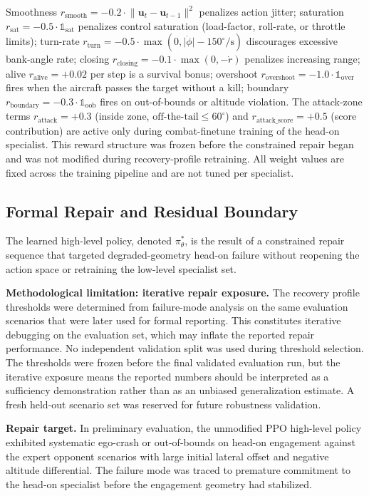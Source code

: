 \documentclass[5p,times]{elsarticle} %
\begin{document}
Smoothness $r_{\text{smooth}} = -0.2 \cdot \lVert \mathbf{u}_t - \mathbf{u}_{t-1} \rVert^2$ penalizes action jitter; saturation $r_{\text{sat}} = -0.5 \cdot \mathbb{1}_{\text{sat}}$ penalizes control saturation (load-factor, roll-rate, or throttle limits); turn-rate $r_{\text{turn}} = -0.5 \cdot \max(0, \lvert \dot{\phi} \rvert - 150^{\circ}/\text{s})$ discourages excessive bank-angle rate; closing $r_{\text{closing}} = -0.1 \cdot \max(0, -\dot{r})$ penalizes increasing range; alive $r_{\text{alive}} = +0.02$ per step is a survival bonus; overshoot $r_{\text{overshoot}} = -1.0 \cdot \mathbb{1}_{\text{over}}$ fires when the aircraft passes the target without a kill; boundary $r_{\text{boundary}} = -0.3 \cdot \mathbb{1}_{\text{oob}}$ fires on out-of-bounds or altitude violation. The attack-zone terms $r_{\text{attack}} = +0.3$ (inside zone, $\text{off-the-tail} \le 60^{\circ}$) and $r_{\text{attack\_score}} = +0.5$ (score contribution) are active only during combat-finetune training of the head-on specialist. This reward structure was frozen before the constrained repair began and was not modified during recovery-profile retraining. All weight values are fixed across the training pipeline and are not tuned per specialist.

\subsection{Formal Repair and Residual Boundary}

The learned high-level policy, denoted $\pi_{\theta}^{*}$, is the result of a constrained repair sequence that targeted degraded-geometry head-on failure without reopening the action space or retraining the low-level specialist set.

\textbf{Methodological limitation: iterative repair exposure.} The recovery profile thresholds were determined from failure-mode analysis on the same evaluation scenarios that were later used for formal reporting. This constitutes iterative debugging on the evaluation set, which may inflate the reported repair performance. No independent validation split was used during threshold selection. The thresholds were frozen before the final validated evaluation run, but the iterative exposure means the reported numbers should be interpreted as a sufficiency demonstration rather than as an unbiased generalization estimate. A fresh held-out scenario set was reserved for future robustness validation.

\textbf{Repair target.} In preliminary evaluation, the unmodified PPO high-level policy exhibited systematic ego-crash or out-of-bounds on head-on engagement against the expert opponent scenarios with large initial lateral offset and negative altitude differential. The failure mode was traced to premature commitment to the head-on specialist before the engagement geometry had stabilized.
\end{document}

